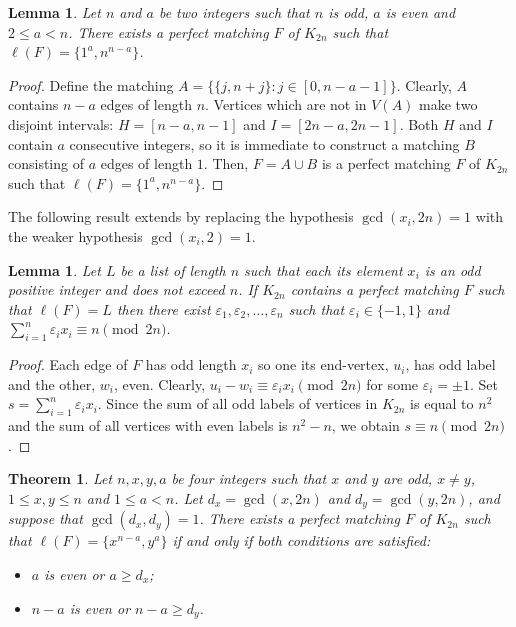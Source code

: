 \documentclass{amsart}
\newtheorem{lem}[defi]{Lemma}
\newtheorem{thm}[defi]{Theorem}
\theoremstyle{definition}
\numberwithin{equation}{section}
\begin{document}
\begin{lem}\label{large_an}
Let $n$ and $a$ be two integers such that $n$ is odd, $a$ is even  and $2\leq a<n$.
There exists a perfect matching $F$ of $K_{2n}$ such that $\ell(F)=\{1^a, n^{n-a}\}$.
\end{lem}

\begin{proof}
Define the matching
$A = \{\{ j, n+j\}: j\in [0,n-a-1]\}.$
Clearly,  $A$ contains $n-a$ edges of length $n$. Vertices which are not in $V(A)$ make two disjoint intervals:
$H=[n-a, n-1]$ and $I=[2n-a, 2n-1]$.
Both $H$ and $I$ contain $a$ consecutive integers, so it is immediate to construct
a matching $B$ consisting of $a$ edges of length $1$. Then, $F=A\cup B$ is 
a perfect matching $F$ of $K_{2n}$ such that $\ell(F)=\{1^a, n^{n-a}\}$.
\end{proof}

The following result extends \cite[Theorem 2.2]{KSC} by replacing the hypothesis $\gcd(x_i,2n)=1$
with the weaker hypothesis $\gcd(x_i,2)=1$.


\begin{lem} \label{necessary}
Let $L$ be a list of length $n$ such that each its element $x_i$ is an odd positive integer and does not exceed $n$.
If $K_{2n}$ contains a perfect matching $F$ such that $\ell(F)=L$ then there exist $\varepsilon_1,\varepsilon_2,\ldots,\varepsilon_n$
such that $\varepsilon_i\in \{-1,1\}$ and $\sum\limits_{i=1}^{n} \varepsilon_i x_i \equiv n\pmod {2n}$.
\end{lem}

\begin{proof}
Each edge of $F$ has odd length $x_i$ so one its end-vertex, $u_i$, has odd label and the other, $w_i$, even.
Clearly, $u_i-w_i\equiv \varepsilon_i x_i \pmod{2n}$ for some $\varepsilon_i=\pm1$.
Set $s=\sum\limits_{i=1}^{n}  \varepsilon_i x_i $. Since the sum of all odd labels of vertices in $K_{2n}$ is equal to $n^2$ and
the sum of all vertices with even labels is $n^2-n$, we obtain $s\equiv n\pmod {2n}$.
\end{proof}


\begin{thm}\label{thm:x odd}
Let $n,x,y,a$ be four integers such that $x$ and $y$ are odd, $x\neq y$, $1\leq x,y\leq n$ and $1\leq a<n$. Let $d_x=\gcd(x,2n)$
and $d_y=\gcd(y,2n)$, and suppose that $\gcd(d_x,d_y)=1$.
There exists a perfect matching $F$ of $K_{2n}$ such that $\ell(F)=\{ x^{n-a}, y^a\}$ if and only if both conditions are satisfied:
\begin{itemize}
\item[(1)] $a$ is even or $a\geq d_x$;
\item[(2)] $n-a$ is even or $n-a\geq d_y$.
\end{itemize}
\end{thm}
\end{document}
